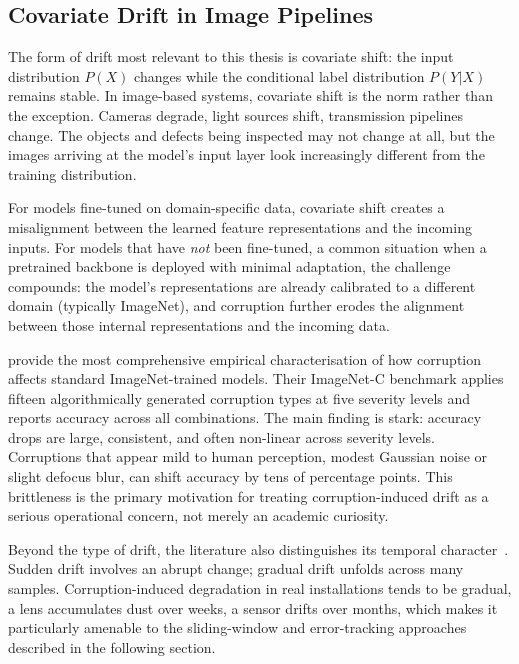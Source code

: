 \subsection{Covariate Drift in Image Pipelines}

The form of drift most relevant to this thesis is covariate shift: the input distribution $P(X)$ changes while the conditional label distribution $P(Y|X)$ remains stable. In image-based systems, covariate shift is the norm rather than the exception. Cameras degrade, light sources shift, transmission pipelines change. The objects and defects being inspected may not change at all, but the images arriving at the model's input layer look increasingly different from the training distribution.

For models fine-tuned on domain-specific data, covariate shift creates a misalignment between the learned feature representations and the incoming inputs. For models that have \textit{not} been fine-tuned, a common situation when a pretrained backbone is deployed with minimal adaptation, the challenge compounds: the model's representations are already calibrated to a different domain (typically ImageNet), and corruption further erodes the alignment between those internal representations and the incoming data.

\textcite{Hendrycks2019} provide the most comprehensive empirical characterisation of how corruption affects standard ImageNet-trained models. Their ImageNet-C benchmark applies fifteen algorithmically generated corruption types at five severity levels and reports accuracy across all combinations. The main finding is stark: accuracy drops are large, consistent, and often non-linear across severity levels. Corruptions that appear mild to human perception, modest Gaussian noise or slight defocus blur, can shift accuracy by tens of percentage points. This brittleness is the primary motivation for treating corruption-induced drift as a serious operational concern, not merely an academic curiosity.

Beyond the type of drift, the literature also distinguishes its temporal character~\autocite{Gama2014}. Sudden drift involves an abrupt change; gradual drift unfolds across many samples. Corruption-induced degradation in real installations tends to be gradual, a lens accumulates dust over weeks, a sensor drifts over months, which makes it particularly amenable to the sliding-window and error-tracking approaches described in the following section.

